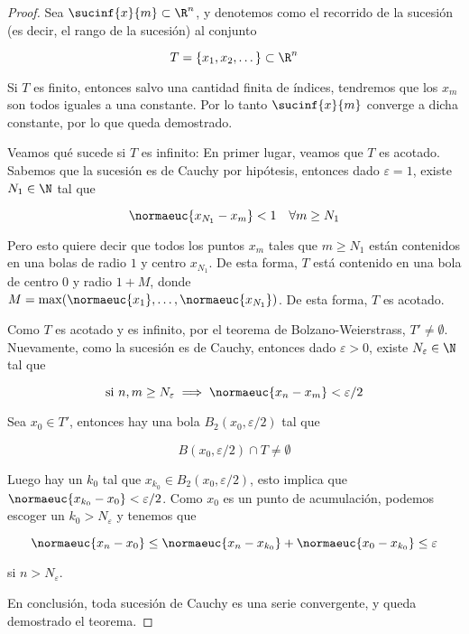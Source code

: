 \begin{proof}
    Sea $\sucinf{x}{m} \subset \R^n$, y denotemos como el recorrido de la sucesión (es decir, el rango de la sucesión) al conjunto
    
    \[
    T = \{x_1, x_2, \dots \} \subset \R^n
    \]
    
    Si $T$ es finito, entonces salvo una cantidad finita de índices, tendremos que los $x_m$ son todos iguales a una constante. Por lo tanto $\sucinf{x}{m}$ converge a dicha constante, por lo que queda demostrado.
    
    Veamos qué sucede si $T$ es infinito: En primer lugar, veamos que $T$ es acotado. Sabemos que la sucesión es de Cauchy por hipótesis, entonces dado $\varepsilon = 1$, existe $N_1 \in \N$ tal que
    
    \[
    \normaeuc{x_{N_1} - x_m} < 1 \quad \forall m \geq N_1
    \]
    
    Pero esto quiere decir que todos los puntos $x_m$ tales que $m \geq N_1$ están contenidos en una bolas de radio $1$ y centro $x_{N_1}$. De esta forma, $T$ está contenido en una bola de centro $0$ y radio $1 + M$, donde $M = \max(\normaeuc{x_1}, \dots, \normaeuc{x_{N_1}})$. De esta forma, $T$ es acotado.
    
    Como $T$ es acotado y es infinito, por el teorema de Bolzano-Weierstrass, $T' \neq \emptyset$. Nuevamente, como la sucesión es de Cauchy, entonces dado $\varepsilon > 0$, existe $N_{\varepsilon} \in \N$ tal que
    
    \[
    \text{si $n, m \geq N_{\varepsilon}$} \implies \normaeuc{x_n - x_m} < \varepsilon/2
    \]
    
    Sea $x_0 \in T'$, entonces hay una bola $B_2(x_0, \varepsilon/2)$ tal que
    
    \[
    B(x_0, \varepsilon/2) \cap T \neq \emptyset
    \]
    
    Luego hay un $k_0$ tal que $x_{k_0} \in B_2(x_0, \varepsilon/2)$, esto implica que $\normaeuc{x_{k_0} - x_0} < \varepsilon/2$. Como $x_0$ es un punto de acumulación, podemos escoger un $k_0 > N_{\varepsilon}$ y tenemos que
    
    \[
    \normaeuc{x_n - x_0} \leq \normaeuc{x_n - x_{k_0}} + \normaeuc{x_0 - x_{k_0}} \leq \varepsilon
    \]
    
    \noindent si $n > N_{\varepsilon}$.
    
    En conclusión, toda sucesión de Cauchy es una serie convergente, y queda demostrado el teorema.
\end{proof}


